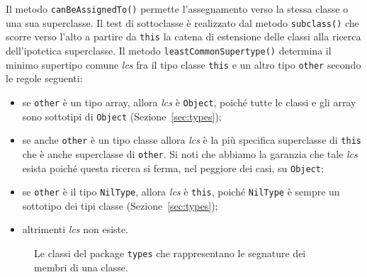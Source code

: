 Il metodo \texttt{canBeAssignedTo()} permette l'assegnamento verso la
stessa classe o una sua superclasse.
Il test di sottoclasse \`e realizzato dal metodo \texttt{subclass()}
che scorre verso l'alto a partire da \texttt{this}
la catena di estensione delle classi alla ricerca
dell'ipotetica superclasse.
Il metodo \texttt{leastCommonSupertype()} determina il minimo supertipo
comune \emph{lcs}
fra il tipo classe \texttt{this} e un altro tipo \texttt{other}
secondo le regole seguenti:
%
\begin{itemize}
\item se \texttt{other} \`e un tipo array, allora \emph{lcs} \`e
      \texttt{Object}, poich\'e tutte le classi e gli array sono
      sottotipi di \texttt{Object} (Sezione~\ref{sec:types});
\item se anche \texttt{other} \`e un tipo classe allora \emph{lcs}
      \`e la pi\`u specifica superclasse di \texttt{this} che \`e anche
      superclasse di \texttt{other}. Si noti che abbiamo la garanzia che
      tale \emph{lcs} esista poich\'e questa ricerca si ferma, nel
      peggiore dei casi, su \texttt{Object};
\item se \texttt{other} \`e il tipo \texttt{NilType}, allora
      \emph{lcs} \`e \texttt{this}, poich\'e \texttt{NilType} \`e
      sempre un sottotipo dei tipi classe (Sezione~\ref{sec:types});
\item altrimenti \emph{lcs} non esiste.
\end{itemize}
%
\begin{figure}[t]
\begin{center}
\end{center}
\caption{Le classi del package \texttt{types} che rappresentano le segnature dei membri di una classe.}\label{fig:signatures}
\end{figure}
%
